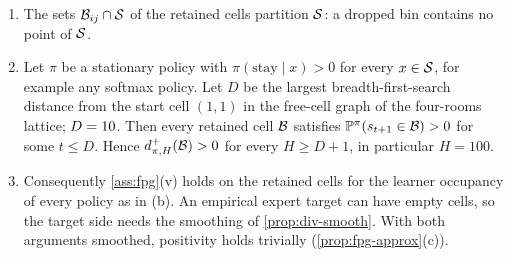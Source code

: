 \begin{proposition}\label{prop:env-cells}
\leavevmode
\begin{enumerate}[nosep,label=(\alph*)]
\item The sets $\cB_{ij}\cap\cS$ of the retained cells partition $\cS$: a dropped bin contains no point of $\cS$.
\item Let $\pi$ be a stationary policy with $\pi(\mathrm{stay}\mid x)>0$ for every $x\in\cS$, for example any softmax policy. Let $D$ be the largest breadth-first-search distance from the start cell $(1,1)$ in the free-cell graph of the four-rooms lattice; $D=\vn{env.D}{10}$. Then every retained cell $\cB$ satisfies $\Prob^\pi(s_{t+1}\in\cB)>0$ for some $t\le D$. Hence $d^+_{\pi,H}(\cB)>0$ for every $H\ge D+1$, in particular $H=100$.
\item Consequently \cref{ass:fpg}(v) holds on the retained cells for the learner occupancy of every policy as in (b). An empirical expert target can have empty cells, so the target side needs the smoothing of \cref{prop:div-smooth}. With both arguments smoothed, positivity holds trivially (\cref{prop:fpg-approx}(c)).
\end{enumerate}
\end{proposition}
